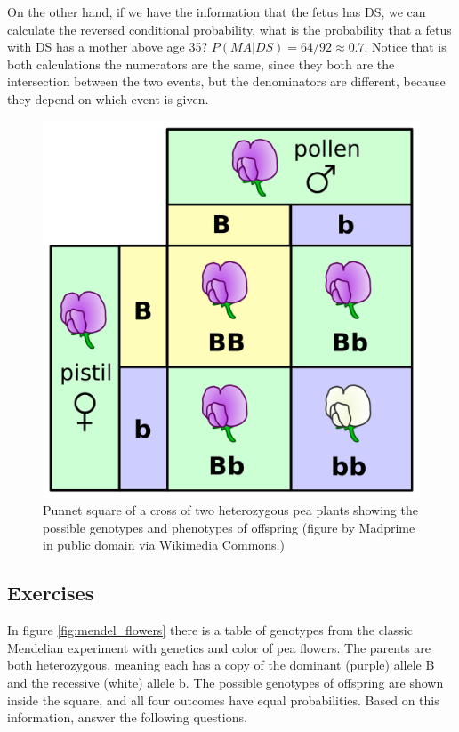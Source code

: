 \documentclass[
  letterpaper,
  DIV=11,
  numbers=noendperiod]{scrreprt}
\begin{document}
On the other hand, if we have the information that the fetus has DS, we
can calculate the reversed conditional probability, what is the
probability that a fetus with DS has a mother above age 35?
\(P(MA | DS) = 64/92 \approx 0.7\). Notice that is both calculations the
numerators are the same, since they both are the intersection between
the two events, but the denominators are different, because they depend
on which event is given.

\begin{figure}

{\centering \includegraphics{./ch6/mendel_flowers.png}

}

\caption{Punnet square of a cross of two heterozygous pea plants showing
the possible genotypes and phenotypes of offspring (figure by Madprime
in public domain via Wikimedia Commons.)}

\end{figure}

\hypertarget{exercises-14}{%
\subsection{Exercises}\label{exercises-14}}

In figure \ref{fig:mendel_flowers} there is a table of genotypes from
the classic Mendelian experiment with genetics and color of pea flowers.
The parents are both heterozygous, meaning each has a copy of the
dominant (purple) allele B and the recessive (white) allele b. The
possible genotypes of offspring are shown inside the square, and all
four outcomes have equal probabilities. Based on this information,
answer the following questions.
\end{document}
